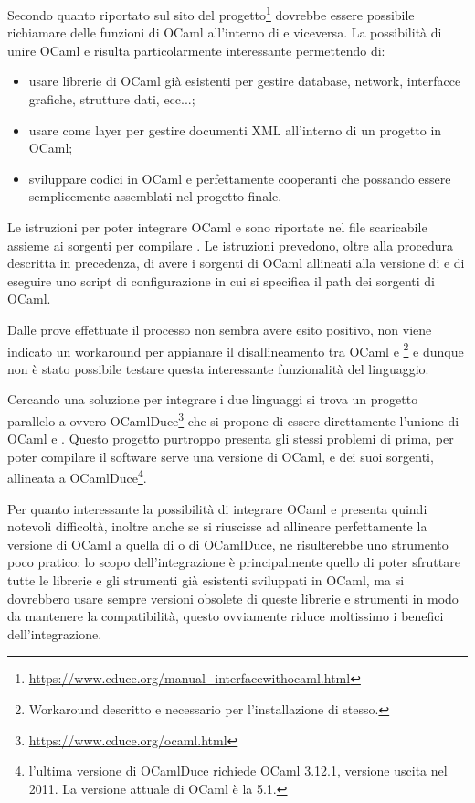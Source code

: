 Secondo quanto riportato sul sito del progetto\footnote{\url{https://www.cduce.org/manual_interfacewithocaml.html}} dovrebbe essere possibile richiamare delle funzioni di OCaml all'interno di \cduce e viceversa. La possibilità di unire OCaml e \cduce risulta particolarmente interessante permettendo di:
\begin{itemize}
	\item usare librerie di OCaml già esistenti per gestire database, network, interfacce grafiche, strutture dati, ecc...;
	\item usare \cduce come layer per gestire documenti XML all'interno di un progetto in OCaml;
	\item sviluppare codici in OCaml e \cduce perfettamente cooperanti che possando essere semplicemente assemblati nel progetto finale.
\end{itemize} 

Le istruzioni per poter integrare OCaml e \cduce sono riportate nel file  scaricabile assieme ai sorgenti per compilare \cduce. Le istruzioni prevedono, oltre alla procedura descritta in precedenza, di avere i sorgenti di OCaml allineati alla versione di \cduce e di eseguire uno script di configurazione in cui si specifica il path dei sorgenti di OCaml.

Dalle prove effettuate il processo non sembra avere esito positivo, non viene indicato un workaround per appianare il disallineamento tra OCaml e \cduce\footnote{Workaround descritto e necessario per l'installazione di \cduce stesso.} e dunque non è stato possibile testare questa interessante funzionalità del linguaggio.

Cercando una soluzione per integrare i due linguaggi si trova un progetto parallelo a \cduce ovvero OCamlDuce\footnote{\url{https://www.cduce.org/ocaml.html}} che si propone di essere direttamente l'unione di OCaml e \cduce. Questo progetto purtroppo presenta gli stessi problemi di prima, per poter compilare il software serve una versione di OCaml, e dei suoi sorgenti, allineata a OCamlDuce\footnote{l'ultima versione di OCamlDuce richiede OCaml 3.12.1, versione uscita nel 2011. La versione attuale di OCaml è la 5.1.}.

Per quanto interessante la possibilità di integrare OCaml e \cduce presenta quindi notevoli difficoltà, inoltre anche se si riuscisse ad allineare perfettamente la versione di OCaml a quella di \cduce o di OCamlDuce, ne risulterebbe uno strumento poco pratico: lo scopo dell'integrazione è principalmente quello di poter sfruttare tutte le librerie e gli strumenti già esistenti sviluppati in OCaml, ma si dovrebbero usare sempre versioni obsolete di queste librerie e strumenti in modo da mantenere la compatibilità, questo ovviamente riduce moltissimo i benefici dell'integrazione.

